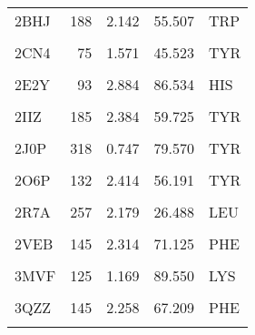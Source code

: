 \begin{table}
{\begin{tabular}{lrrrl}
				\addlinespace
				2BHJ & 188 & 2.142 & 55.507 & TRP\\
				\cellcolor{gray!6}{2CJ0} & \cellcolor{gray!6}{108} & \cellcolor{gray!6}{2.241} & \cellcolor{gray!6}{56.216} & \cellcolor{gray!6}{SER}\\
				2CN4 & 75 & 1.571 & 45.523 & TYR\\
				\cellcolor{gray!6}{2CPO} & \cellcolor{gray!6}{108} & \cellcolor{gray!6}{2.167} & \cellcolor{gray!6}{52.106} & \cellcolor{gray!6}{SER}\\
				2E2Y & 93 & 2.884 & 86.534 & HIS\\
				\addlinespace
				\cellcolor{gray!6}{2FC2} & \cellcolor{gray!6}{56} & \cellcolor{gray!6}{1.708} & \cellcolor{gray!6}{58.198} & \cellcolor{gray!6}{TRP}\\
				2IIZ & 185 & 2.384 & 59.725 & TYR\\
				\cellcolor{gray!6}{2IPS} & \cellcolor{gray!6}{101} & \cellcolor{gray!6}{3.075} & \cellcolor{gray!6}{84.120} & \cellcolor{gray!6}{MET}\\
				2J0P & 318 & 0.747 & 79.570 & TYR\\
				\cellcolor{gray!6}{2J18} & \cellcolor{gray!6}{108} & \cellcolor{gray!6}{2.222} & \cellcolor{gray!6}{55.263} & \cellcolor{gray!6}{SER}\\
				\addlinespace
				2O6P & 132 & 2.414 & 56.191 & TYR\\
				\cellcolor{gray!6}{2Q6N} & \cellcolor{gray!6}{303} & \cellcolor{gray!6}{1.595} & \cellcolor{gray!6}{56.344} & \cellcolor{gray!6}{THR}\\
				2R7A & 257 & 2.179 & 26.488 & LEU\\
				\cellcolor{gray!6}{2SPL} & \cellcolor{gray!6}{93} & \cellcolor{gray!6}{2.890} & \cellcolor{gray!6}{88.954} & \cellcolor{gray!6}{HIS}\\
				2VEB & 145 & 2.314 & 71.125 & PHE\\
				\addlinespace
				\cellcolor{gray!6}{3HX9} & \cellcolor{gray!6}{81} & \cellcolor{gray!6}{2.600} & \cellcolor{gray!6}{86.961} & \cellcolor{gray!6}{ASN}\\
				3MVF & 125 & 1.169 & 89.550 & LYS\\
				\cellcolor{gray!6}{3QZN} & \cellcolor{gray!6}{83} & \cellcolor{gray!6}{2.699} & \cellcolor{gray!6}{67.495} & \cellcolor{gray!6}{HIS}\\
				3QZZ & 145 & 2.258 & 67.209 & PHE\\
				\cellcolor{gray!6}{3SIK} & \cellcolor{gray!6}{136} & \cellcolor{gray!6}{2.207} & \cellcolor{gray!6}{52.942} & \cellcolor{gray!6}{TYR}\\

\end{tabular}}
\end{table}
